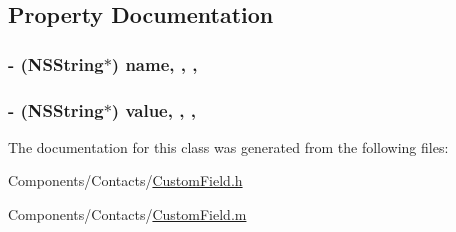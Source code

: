 \subsection{Property Documentation}
\hypertarget{interface_custom_field_a1814194d29f8a3be86cc84eced716cf3}{
\subsubsection[{name}]{\setlength{\rightskip}{0pt plus 5cm}-\/ (N\-S\-String$\ast$) name\hspace{0.3cm}{\ttfamily [read]}, {\ttfamily [write]}, {\ttfamily [nonatomic]}, {\ttfamily [strong]}}}\label{interface_custom_field_a1814194d29f8a3be86cc84eced716cf3}
\hypertarget{interface_custom_field_a13d5a49c45fb733b3784ecc2fb53f643}{
\subsubsection[{value}]{\setlength{\rightskip}{0pt plus 5cm}-\/ (N\-S\-String$\ast$) value\hspace{0.3cm}{\ttfamily [read]}, {\ttfamily [write]}, {\ttfamily [nonatomic]}, {\ttfamily [strong]}}}\label{interface_custom_field_a13d5a49c45fb733b3784ecc2fb53f643}


The documentation for this class was generated from the following files\-:\begin{DoxyCompactItemize}
\item 
Components/\-Contacts/\hyperlink{_custom_field_8h}{Custom\-Field.\-h}\item 
Components/\-Contacts/\hyperlink{_custom_field_8m}{Custom\-Field.\-m}\end{DoxyCompactItemize}

